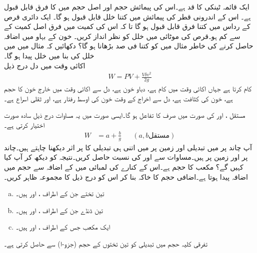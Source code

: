 ایک قائمہ ٹینکی کا قد  ہے۔اس کی پیمائش حجم اور اصل حجم میں  کا فرق قابل قبول ہے۔ اس کے اندرونی قطر کی پیمائش میں کتنا خلل قابل قبول ہو گا۔
ایک دائری قرص کے رداس میں کتنا فرق  قابل قبول ہو گا تا کہ اس کی کمیت میں فرق اصل کمیت کے  سے کم ہو۔قرص کی موٹائی میں خلل کو نظر انداز کریں۔ 
خون کے بہاو میں  اضافہ حاصل کرنے کی خاطر مثال  میں  کو کتنا فی صد بڑھانا ہو گا؟
دکھائیں کہ مثال  میں  میں  خلل کی بنا  میں  خلل پیدا ہو گا۔
\\
اکائی وقت میں دل درج ذیل
\begin{align*}
W=PV+\frac{V\delta v^2}{2g}
\end{align*}
کام کرتا ہے جہاں  اکائی وقت میں کام ہے،  دباو خون ہے،  دل سے اکائی وقت میں خارج خون کا حجم ہے، خون کی کثافت ہے،  دل سے اخراج کے وقت خون کی اوسط رفتار ہے، اور  ثقلی اسراع ہے۔

مستقل ،  اور  کی صورت میں  صرف  کا تفاعل ہو گا۔ایسی صورت میں یہ مساوات درج ذیل سادہ صورت اختیار کرتی ہے۔
\begin{align}\label{مساوات_استعمال_چاند}
W&=a+\frac{b}{g}&&(a,b \text{مستقل})
\end{align}  
آپ  چاند پر  میں تبدیلی  اور زمین پر  میں اتنی ہی  تبدیلی  کا  پر  اثر  دیکھنا چاہتے ہیں۔چاند پر  اور زمین پر  ہیں۔مساوات  سے  اور  کی نسبت حاصل کریں۔نتیجہ کو دیکھ کر آپ کیا کہیں گے؟
مکعب کا حجم  ہے۔اس کے کنارے کی لمبائی میں  کے اضافہ سے حجم میں  اضافہ پیدا ہوتا ہے۔اضافی حجم  کا خاکہ بنا کر اس کو درج ذیل کا مجموعہ ظاہر کریں۔
\begin{enumerate}[a.]
\item
تین تختے جن کے اطراف ،  اور  ہیں۔
\item
تین ڈنڈے جن کے اطراف ،  اور  ہیں۔
\item
ایک مکعب جس کے اطراف ،  اور  ہیں۔
\end{enumerate} 
تفرقی کلیہ   حجم میں تبدیلی کو تین تختوں کے حجم (جزو-ا) سے حاصل کرتی ہے۔
